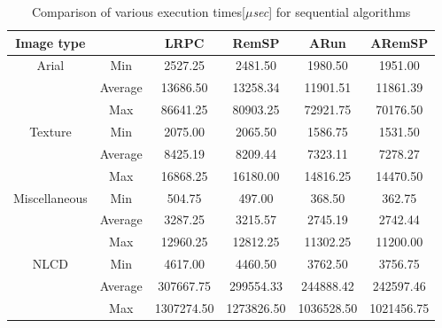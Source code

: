 \begin{table*}[ht]
\caption{Comparison of various execution times[{\em $\mu$sec}] for sequential algorithms}
\centering
\begin{tabular}{c c c c c c} 
\hline\hline
Image type &  & LRPC & RemSP & ARun & ARemSP\\ [0.5ex] 
\hline 
Arial & Min & 2527.25 & 2481.50 & 1980.50 & 1951.00 \\ 
 & Average & 13686.50 & 13258.34 & 11901.51 & 11861.39\\
 & Max & 86641.25 & 80903.25 & 72921.75 & 70176.50 \\
[1ex]
 \hline
Texture & Min &2075.00 & 2065.50 & 1586.75 & 1531.50 \\
 & Average & 8425.19 & 8209.44 & 7323.11 & 7278.27 \\
 & Max & 16868.25 & 16180.00 & 14816.25 & 14470.50\\
[1ex]
 \hline
Miscellaneous & Min & 504.75 & 497.00 & 368.50 & 362.75\\
 & Average & 3287.25 & 3215.57 & 2745.19 & 2742.44 \\
 & Max &12960.25 & 12812.25 & 11302.25 & 11200.00\\
 [1ex]
\hline
NLCD & Min & 4617.00 & 4460.50	& 3762.50 & 3756.75 \\
& Average & 307667.75 & 299554.33 & 244888.42 & 242597.46 \\
& Max & 1307274.50 & 1273826.50 & 1036528.50 & 1021456.75 \\[1ex]
\hline
\end{tabular}
\label{table:seq} 
\end{table*}
